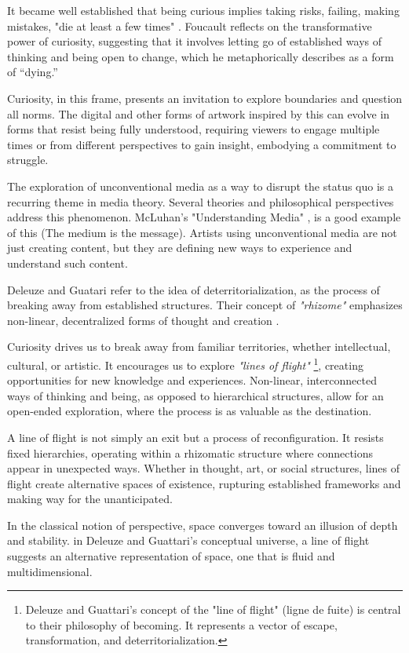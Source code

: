 It became well established that being curious implies taking risks, failing, making mistakes, "die at least a few times" \citep{foucault1980masked}. Foucault reflects on the transformative power of curiosity, suggesting that it involves letting go of established ways of thinking and being open to change, which he metaphorically describes as a form of “dying.”

Curiosity, in this frame, presents an invitation to explore boundaries and question all norms. The digital and other forms of artwork inspired by this can evolve in forms that resist being fully understood, requiring viewers to engage multiple times or from different perspectives to gain insight, embodying a commitment to struggle.

The exploration of unconventional media as a way to disrupt the status quo is a recurring theme in media theory. Several theories and philosophical perspectives address this phenomenon. McLuhan's "Understanding Media" \citep{mcluhan1964}, is a good example of this (The medium is the message). Artists using unconventional media are not just creating content, but they are defining new ways to experience and understand such content.

Deleuze and Guatari refer to the idea of deterritorialization, as the process of breaking away from established structures. Their concept of \textit{"rhizome"} emphasizes non-linear, decentralized forms of thought and creation \citep{deleuze1980}.

Curiosity drives us to break away from familiar territories, whether intellectual, cultural, or artistic. It encourages us to explore \textit{"lines of flight"} \footnote{Deleuze and Guattari's concept of the "line of flight" (ligne de fuite) is central to their philosophy of becoming. It represents a vector of escape, transformation, and deterritorialization.}, creating opportunities for new knowledge and experiences. Non-linear, interconnected ways of thinking and being, as opposed to hierarchical structures, allow for an open-ended exploration, where the process is as valuable as the destination.

A line of flight is not simply an exit but a process of reconfiguration. It resists fixed hierarchies, operating within a rhizomatic structure where connections appear in unexpected ways. Whether in thought, art, or social structures, lines of flight create alternative spaces of existence, rupturing established frameworks and making way for the unanticipated.

In the classical notion of perspective, space converges toward an illusion of depth and stability. in Deleuze and Guattari's conceptual universe, a line of flight suggests an alternative representation of space, one that is fluid and multidimensional.